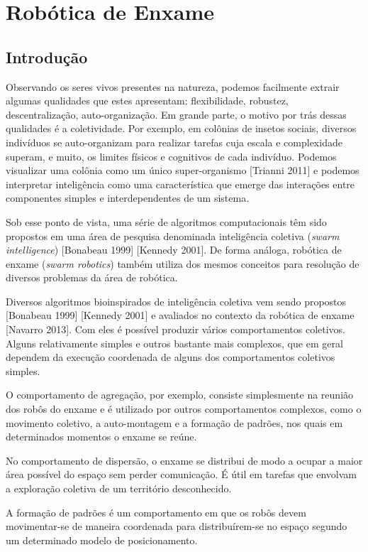 \chapter{Rob{\'o}tica de Enxame}
\label{swarm}

\section{Introdução}

Observando os seres vivos presentes na natureza, podemos facilmente extrair algumas qualidades que estes apresentam: flexibilidade, robustez, descentralização, auto-organização. Em grande parte, o motivo por trás dessas qualidades é a coletividade. Por exemplo, em colônias de insetos sociais, diversos indivíduos se auto-organizam para realizar tarefas cuja  escala e complexidade superam, e muito, os limites físicos e cognitivos de cada indivíduo. Podemos visualizar uma colônia como um único super-organismo [Trianni 2011] e podemos interpretar inteligência como uma característica que emerge das interações entre componentes simples e interdependentes de um sistema.

Sob esse ponto de vista, uma série de algoritmos computacionais têm sido propostos em
uma área de pesquisa denominada inteligência coletiva (\textit{swarm intelligence}) [Bonabeau 1999]
[Kennedy 2001]. De forma análoga, robótica de enxame (\textit{swarm robotics}) também utiliza dos mesmos conceitos para resolução de diversos problemas da área de robótica.

Diversos algoritmos bioinspirados de inteligência coletiva vem sendo propostos [Bonabeau 1999] [Kennedy 2001] e avaliados no contexto da robótica de enxame [Navarro 2013]. Com eles é possível produzir vários comportamentos coletivos. Alguns relativamente simples e outros bastante mais complexos, que em geral dependem da execução coordenada de alguns dos comportamentos coletivos simples.

O comportamento de agregação, por exemplo, consiste simplesmente na reunião dos
robôs do enxame e é utilizado por outros comportamentos complexos, como o movimento
coletivo, a auto-montagem e a formação de padrões, nos quais em determinados momentos o
enxame se reúne.

No comportamento de dispersão, o enxame se distribui de modo a ocupar a maior área
possível do espaço sem perder comunicação. É útil em tarefas que envolvam a exploração
coletiva de um território desconhecido.

A formação de padrões é um comportamento em que os robôs devem movimentar-se de
maneira coordenada para distribuírem-se no espaço segundo um determinado modelo de
posicionamento.

